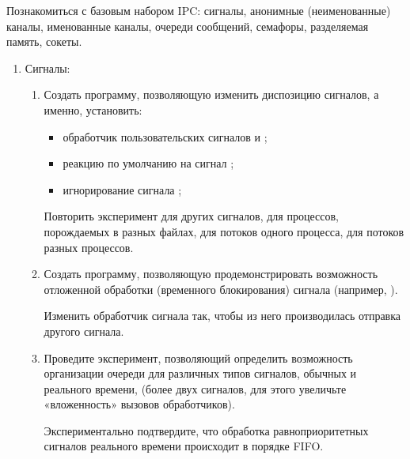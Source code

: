 \renewcommand{\labelenumii}{\theenumii}
\renewcommand{\theenumii}{\theenumi.\arabic{enumii}.}

Познакомиться с базовым набором IPC: сигналы, анонимные (неименованные) каналы, именованные каналы, очереди сообщений, семафоры, разделяемая память, сокеты.

\begin{enumerate}
	\item Сигналы:
		\begin{enumerate}
			\item Создать программу, позволяющую изменить диспозицию сигналов, а именно, установить:
				\begin{itemize}[itemsep=0.3em]
					\item обработчик пользовательских сигналов  и ;
					\item реакцию по умолчанию на сигнал ;
					\item игнорирование сигнала ;
				\end{itemize}
			Повторить эксперимент для других сигналов, для процессов, порождаемых в разных файлах, для потоков одного процесса, для потоков разных процессов.
			\item Создать программу, позволяющую продемонстрировать возможность отложенной обработки (временного блокирования) сигнала (например, ).
			
			Изменить обработчик сигнала так, чтобы из него производилась отправка другого сигнала.
			\item Проведите эксперимент, позволяющий определить возможность организации очереди для различных типов сигналов, обычных и реального времени, (более двух сигналов, для этого увеличьте «вложенность» вызовов обработчиков).
			
			Экспериментально подтвердите, что обработка равноприоритетных сигналов реального времени происходит в порядке FIFO.
			

\end{enumerate}
\end{enumerate}
